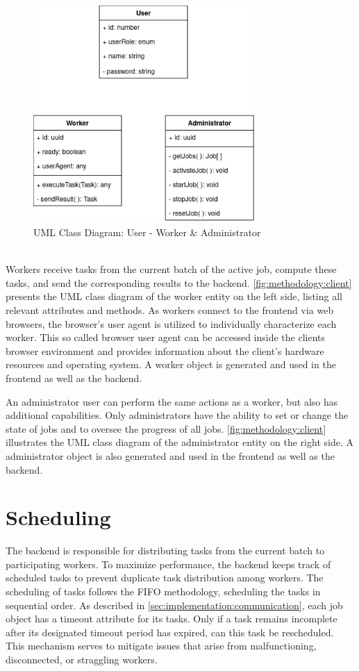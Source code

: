 \begin{figure}[htbp]
    \centering
    \includegraphics[width=0.75\textwidth]{gfx/figures/Client.png}
    \caption{\acs{UML} Class Diagram: User - Worker \& Administrator}
    \label{fig:methodology:client}
\end{figure}
~\\
Workers receive tasks from the current batch of the active job, compute these tasks, and send the corresponding results to the backend. \autoref{fig:methodology:client} presents the \ac{UML} class diagram of the worker entity on the left side, listing all relevant attributes and methods. As workers connect to the frontend via web browsers, the browser's user agent is utilized to individually characterize each worker. This so called browser user agent can be accessed inside the clients browser environment and provides information about the client's hardware resources and operating system. A worker object is generated and used in the frontend as well as the backend.

An administrator user can perform the same actions as a worker, but also has additional capabilities. Only administrators have the ability to set or change the state of jobs and to oversee the progress of all jobs. \autoref{fig:methodology:client} illustrates the \ac{UML} class diagram of the administrator entity on the right side. A administrator object is also generated and used in the frontend as well as the backend.

\section{Scheduling}
\label{sec:implementation:scheduling}
The backend is responsible for distributing tasks from the current batch to participating workers. To maximize performance, the backend keeps track of scheduled tasks to prevent duplicate task distribution among workers. The scheduling of tasks follows the \ac{FIFO} methodology, scheduling the tasks in sequential order. As described in \autoref{sec:implementation:communication}, each job object has a timeout attribute for its tasks. Only if a task remains incomplete after its designated timeout period has expired, can this task be rescheduled. This mechanism serves to mitigate issues that arise from malfunctioning, disconnected, or straggling workers.

